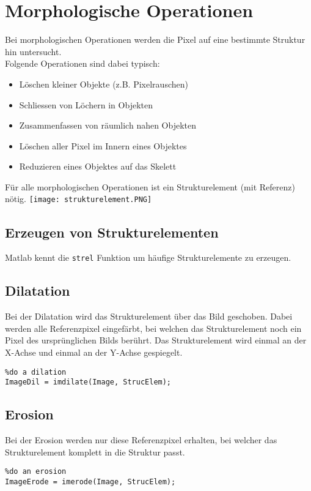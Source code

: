 \section{Morphologische Operationen}
Bei morphologischen Operationen werden die Pixel auf eine bestimmte Struktur hin untersucht.\\
Folgende Operationen sind dabei typisch:
\begin{itemize}
    \item Löschen kleiner Objekte (z.B. Pixelrauschen)
    \item Schliessen von Löchern in Objekten
    \item Zusammenfassen von räumlich nahen Objekten
    \item Löschen aller Pixel im Innern eines Objektes
    \item Reduzieren eines Objektes auf das Skelett
\end{itemize}
Für alle morphologischen Operationen ist ein Strukturelement (mit Referenz) nötig.
\texttt{[image: strukturelement.PNG]}
\subsection{Erzeugen von Strukturelementen}
Matlab kennt die \lstinline{strel} Funktion um häufige Strukturelemente zu erzeugen.

\subsection{Dilatation}
Bei der Dilatation wird das Strukturelement über das Bild geschoben. Dabei werden alle Referenzpixel eingefärbt, bei welchen das Strukturelement noch ein Pixel des ursprünglichen Bilds berührt.
Das Strukturelement wird einmal an der X-Achse und einmal an der Y-Achse gespiegelt.
\begin{lstlisting}
%do a dilation 
ImageDil = imdilate(Image, StrucElem);
\end{lstlisting}

\subsection{Erosion}
Bei der Erosion werden nur diese Referenzpixel erhalten, bei welcher das Strukturelement komplett in die Struktur passt.
\begin{lstlisting}
%do an erosion 
ImageErode = imerode(Image, StrucElem);
\end{lstlisting}

